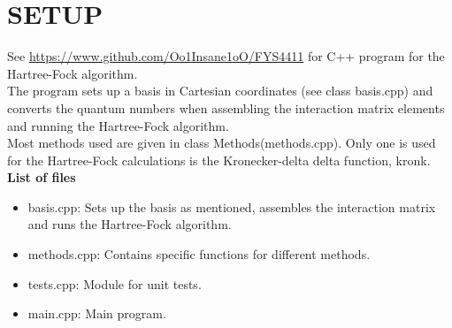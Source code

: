 \documentclass[a4paper, hidelinks, 10pt]{article}
\let\oldsection\section
\renewcommand{\section}[1]{\centering \oldsection{{#1}} \justifying}
\begin{document}
\section{SETUP}
\label{sec:setup}
    See \url{https://www.github.com/Oo1Insane1oO/FYS4411} for C++ program for the
    Hartree-Fock algorithm. \\
    The program sets up a basis in Cartesian coordinates (see class basis.cpp)
    and converts the quantum numbers when assembling the interaction matrix
    elements and running the Hartree-Fock algorithm. \\
    Most methods used are given in class Methods(methods.cpp). Only one is used
    for the Hartree-Fock calculations is the Kronecker-delta delta function,
    kronk. \\
    \textbf{List of files}
        \begin{itemize}
            \item basis.cpp: Sets up the basis as mentioned, assembles the
                interaction matrix and runs the Hartree-Fock algorithm.
            \item methods.cpp: Contains specific functions for different
                methods.
            \item tests.cpp: Module for unit tests.
            \item main.cpp: Main program.
        \end{itemize}
\end{document}

